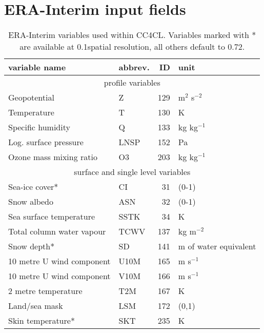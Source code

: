 \documentclass[amt]{style/copernicus}
\begin{document}
\section{ERA-Interim input fields}
\begin{table}[ht]
  \caption{ERA-Interim variables used within CC4CL. Variables marked with * are available at 0.1\textdegree spatial resolution, all others default to 0.72\textdegree.}
  \begin{tabular}{p{3.8cm}|l|r|p{1.5cm}}
    \hline
    variable name & abbrev. & ID & unit \\
    \hline
    \multicolumn{4}{c}{profile variables} \\
    \hline
    Geopotential & Z & 129 & m$^2$ s$^{-2}$ \\
    Temperature  & T & 130 & K \\
    Specific humidity & Q & 133 & kg kg$^{-1}$ \\
    Log. surface pressure & LNSP & 152 & Pa \\
    Ozone mass mixing ratio & O3 & 203 & kg kg$^{-1}$ \\
    \hline
    \multicolumn{4}{c}{surface and single level variables} \\
    \hline
    Sea-ice cover* & CI & 31 & (0-1) \\
    Snow albedo & ASN & 32 & (0-1) \\
    Sea surface temperature & SSTK & 34 & K \\
    Total column water vapour & TCWV & 137 & kg m$^{-2}$ \\
    Snow depth* & SD & 141 & m of water equivalent \\
    10 metre U wind component & U10M & 165 & m s$^{-1}$ \\
    10 metre U wind component & V10M & 166 & m s$^{-1}$ \\
    2 metre temperature & T2M & 167 & K \\
    Land/sea mask & LSM & 172 & (0,1) \\
    Skin temperature* & SKT & 235 & K \\
    \hline
  \end{tabular}
  \label{tab:ERA-Interim}
\end{table}
\end{document}

